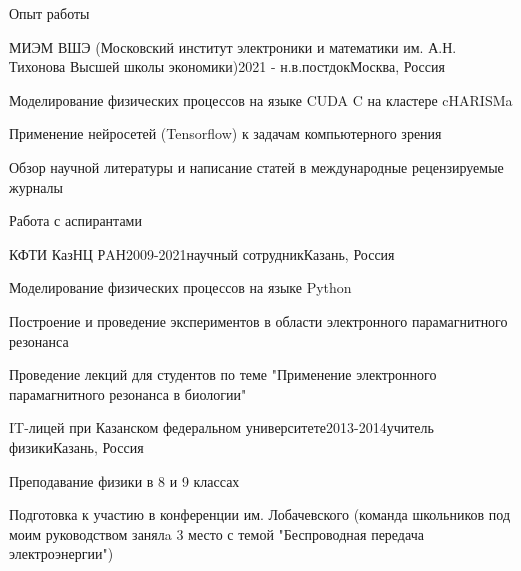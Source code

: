 \documentclass[
	a4paper, %
	11pt, %
]{resume} %
\begin{document}
\begin{rSection}{Опыт работы}

	\begin{rSubsection}{МИЭМ ВШЭ (Московский институт электроники и математики им. А.Н. Тихонова Высшей школы экономики)}{2021 - н.в.}{постдок}{Москва, Россия}
		\item Моделирование физических процессов на языке CUDA C на кластере cHARISMa
		\item Применение нейросетей (Tensorflow) к задачам компьютерного зрения
		\item Обзор научной литературы и написание статей в международные рецензируемые журналы
		\item Работа с аспирантами
	\end{rSubsection}


	\begin{rSubsection}{КФТИ КазНЦ РAН}{2009-2021}{научный сотрудник}{Казань, Россия}
		\item Моделирование физических процессов на языке Python
		\item Построение и проведение экспериментов в области электронного парамагнитного резонанса
		\item Проведение лекций для студентов по теме "Применение электронного парамагнитного резонанса в биологии"
	\end{rSubsection}


	\begin{rSubsection}{IT-лицей при Казанском федеральном университете}{2013-2014}{учитель физики}{Казань, Россия}
		\item Преподавание физики в 8 и 9 классах
		\item Подготовка к участию в конференции им. Лобачевского (команда школьников под моим руководством занялa 3 место с темой "Беспроводная передача электроэнергии")
	\end{rSubsection}


\end{rSection}

\end{document}
